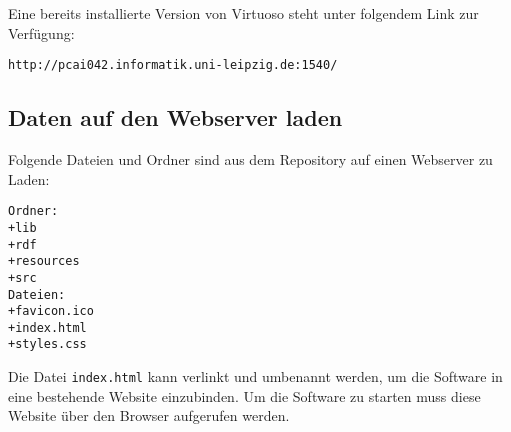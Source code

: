 \documentclass[11pt,a4paper]{article}
\begin{document}
Eine bereits installierte Version von Virtuoso steht unter folgendem Link zur Verfügung:
\begin{lstlisting}
http://pcai042.informatik.uni-leipzig.de:1540/
\end{lstlisting}
\newpage
\subsection{Daten auf den Webserver laden}
Folgende Dateien und Ordner sind aus dem Repository auf einen Webserver zu Laden:
\begin{lstlisting}
Ordner:
+lib
+rdf
+resources
+src
Dateien:
+favicon.ico
+index.html
+styles.css
\end{lstlisting}
Die Datei \lstinline$index.html$ kann verlinkt und umbenannt werden, um die Software in eine bestehende Website einzubinden.
Um die Software zu starten muss diese Website über den Browser aufgerufen werden.
\end{document}
